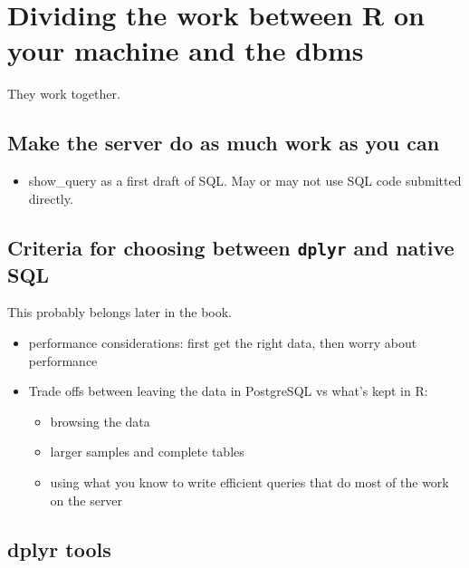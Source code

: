 \documentclass[]{book}
\providecommand{\tightlist}{%
  \setlength{\itemsep}{0pt}\setlength{\parskip}{0pt}}
\theoremstyle{definition}
\theoremstyle{definition}
\theoremstyle{definition}
\theoremstyle{remark}
\begin{document}
\hypertarget{dividing-the-work-between-r-on-your-machine-and-the-dbms}{%
\section{Dividing the work between R on your machine and the
dbms}\label{dividing-the-work-between-r-on-your-machine-and-the-dbms}}

They work together.

\hypertarget{make-the-server-do-as-much-work-as-you-can}{%
\subsection{Make the server do as much work as you
can}\label{make-the-server-do-as-much-work-as-you-can}}

\begin{itemize}
\tightlist
\item
  show\_query as a first draft of SQL. May or may not use SQL code
  submitted directly.
\end{itemize}

\hypertarget{criteria-for-choosing-between-dplyr-and-native-sql}{%
\subsection{\texorpdfstring{Criteria for choosing between \texttt{dplyr}
and native
SQL}{Criteria for choosing between dplyr and native SQL}}\label{criteria-for-choosing-between-dplyr-and-native-sql}}

This probably belongs later in the book.

\begin{itemize}
\tightlist
\item
  performance considerations: first get the right data, then worry about
  performance
\item
  Trade offs between leaving the data in PostgreSQL vs what's kept in R:

  \begin{itemize}
  \tightlist
  \item
    browsing the data
  \item
    larger samples and complete tables
  \item
    using what you know to write efficient queries that do most of the
    work on the server
  \end{itemize}
\end{itemize}

\hypertarget{dplyr-tools}{%
\subsection{dplyr tools}\label{dplyr-tools}}
\end{document}
